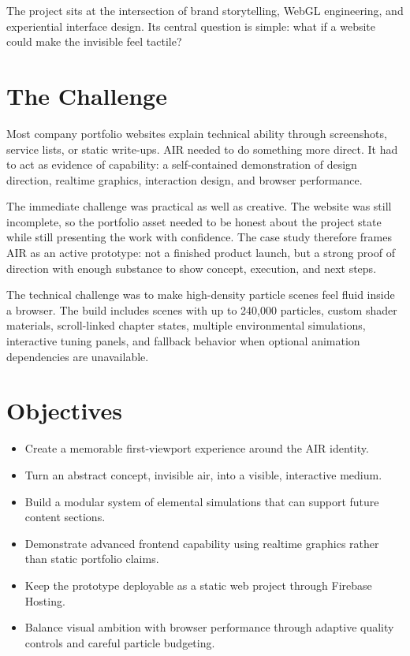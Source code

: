 \documentclass[11pt,a4paper]{article}
\newcommand{\sectionrule}{\vspace{0.2em}{\color{AirLine}\hrule height 0.8pt}\vspace{0.8em}}
\begin{document}
The project sits at the intersection of brand storytelling, WebGL engineering, and experiential interface design. Its central question is simple: what if a website could make the invisible feel tactile?

\section*{The Challenge}
\sectionrule

Most company portfolio websites explain technical ability through screenshots, service lists, or static write-ups. AIR needed to do something more direct. It had to act as evidence of capability: a self-contained demonstration of design direction, realtime graphics, interaction design, and browser performance.

The immediate challenge was practical as well as creative. The website was still incomplete, so the portfolio asset needed to be honest about the project state while still presenting the work with confidence. The case study therefore frames AIR as an active prototype: not a finished product launch, but a strong proof of direction with enough substance to show concept, execution, and next steps.

The technical challenge was to make high-density particle scenes feel fluid inside a browser. The build includes scenes with up to 240,000 particles, custom shader materials, scroll-linked chapter states, multiple environmental simulations, interactive tuning panels, and fallback behavior when optional animation dependencies are unavailable.

\section*{Objectives}
\sectionrule

\begin{itemize}
  \item Create a memorable first-viewport experience around the AIR identity.
  \item Turn an abstract concept, invisible air, into a visible, interactive medium.
  \item Build a modular system of elemental simulations that can support future content sections.
  \item Demonstrate advanced frontend capability using realtime graphics rather than static portfolio claims.
  \item Keep the prototype deployable as a static web project through Firebase Hosting.
  \item Balance visual ambition with browser performance through adaptive quality controls and careful particle budgeting.
\end{itemize}
\end{document}
